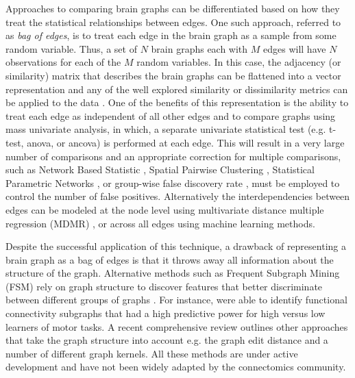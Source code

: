 Approaches to comparing brain graphs can be differentiated based on how they treat the statistical relationships between edges. One such approach, referred to as \emph{bag of edges}, is to treat each edge in the brain graph as a sample from some random variable. Thus, a set of $N$ brain graphs each with $M$ edges will have $N$ observations for each of the $M$ random variables. In this case, the adjacency (or similarity) matrix that describes the brain graphs can be flattened into a vector representation and any of the well explored similarity or dissimilarity metrics can be applied to the data \cite{Craddock2013}. One of the benefits of this representation is the ability to treat each edge as independent of all other edges and to compare graphs using mass univariate analysis, in which, a separate univariate statistical test (e.g. t-test, anova, or ancova) is performed at each edge. This will result in a very large number of comparisons and an appropriate correction for multiple comparisons, such as Network Based Statistic \cite{Zalesky2012}, Spatial Pairwise Clustering \cite{Zalesky2012}, Statistical Parametric Networks \cite{Ginestat2011}, or group-wise false discovery rate \cite{Benjamini2001}, must be employed to control the number of false positives. Alternatively the interdependencies between edges can be modeled at the node level using multivariate distance multiple regression (MDMR) \cite{Shehzad2014}, or across all edges using machine learning methods\cite{Craddock2009, Dosenbach2010, Richiardi2011}.

Despite the successful application of this technique, a drawback of representing a brain graph as a bag of edges is that it throws away all information about the structure of the graph. Alternative methods such as Frequent Subgraph Mining (FSM) rely on graph structure to discover features that better discriminate between different groups of graphs \cite{Harrison2013}. For instance, \cite{Bogdanov2014} were able to identify functional connectivity subgraphs that had a high predictive power for high versus low learners of motor tasks. A recent comprehensive review \cite{Richiardi2013} outlines other approaches that take the graph structure into account e.g. the graph edit distance and a number of different graph kernels. All these methods are under active development and have not been widely adapted by the connectomics community.

